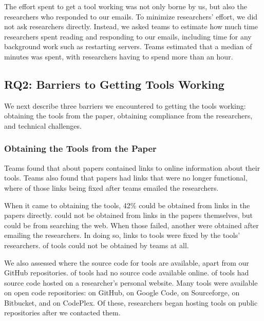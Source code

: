 \documentclass[10pt,conference]{IEEEtran}
\begin{document}
The effort spent to get a tool working was not only
borne by us, but also the researchers who 
responded to our emails.
To minimize researchers' effort, we did not ask researchers directly.
Instead, we asked teams to estimate how much time researchers spent 
reading and responding to our emails, including time for 
any background work such as restarting servers.
Teams estimated that a median of \durationAuthorResponse minutes 
was spent, with \durationAuthorResponseCountHigh researchers having
to spend more than an hour.

\subsection{RQ2: Barriers to Getting Tools Working}

We next describe three barriers we encountered 
to getting the tools working:
obtaining the tools from the paper,
obtaining compliance from the researchers,
and technical challenges. 


\subsubsection{Obtaining the Tools from the Paper}

Teams found that about \papersWithLinks papers
contained links to online information about their tools.
Teams also found that \papersWithLinksDead papers
had links that were no longer functional,
where \papersWithLinksRevived of those links
being fixed after teams emailed the researchers.

When it came to obtaining the tools, 42\%
could be obtained from links in 
the papers directly.
\obtainGoogle could not be obtained from
links in the papers themselves, but could be
from searching the web.
When those failed, another \obtainEmail were 
obtained after emailing the researchers.
In doing so, \contactFixLink links to tools 
were fixed by the tools' researchers.
\obtainNot of tools could not be obtained
by teams at all.

We also assessed where the source code for tools are available,
apart from our GitHub repositories.
\onlineNotAvail of tools had no source code available 
online.
\onlinePersonalSite of tools had source code hosted
on a researcher's personal website.
Many tools were available on open code repositories:
\onlineGitHub on GitHub, 
\onlineGcode on Google Code,
\onlineSourceforge on Sourceforge,
\onlineBitbucket on Bitbucket,
and \onlineCodeplex on CodePlex.
Of these, researchers began hosting \contactHosted tools 
on public repositories after
we contacted them.
\end{document}
